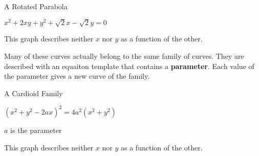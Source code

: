 \documentclass{ximera}
\begin{document}
\begin{example} A Rotated Parabola


$x^2 + 2 x y + y^2 + \sqrt{2} x - \sqrt{2} y = 0$







\begin{center}
\end{center}











This graph describes neither $x$ nor $y$ as a function of the other.



\end{example}













Many of these curves actually belong to the same family of curves.  They are described with an equaiton template that contains a \textbf{parameter}. Each value of the parameter gives a new curve of the family.


\begin{example} A Cardioid Family


$(x^2 + y^2 - 2 a x)^2 = 4 a^2 (x^2 +y^2)$

$a$ is the parameter





\begin{center}
\end{center}











This graph describes neither $x$ nor $y$ as a function of the other.



\end{example}
\end{document}
